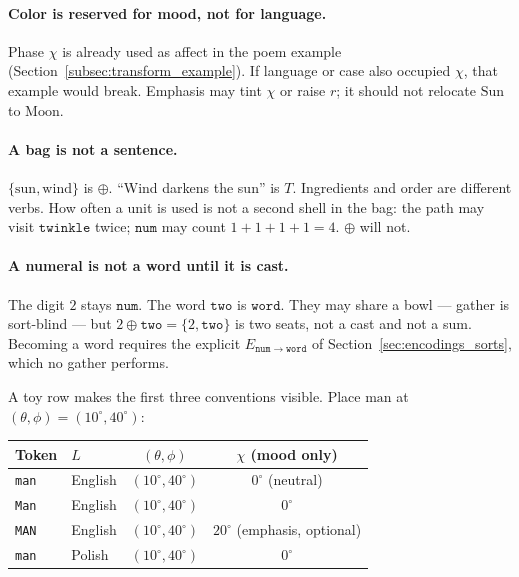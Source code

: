 \documentclass[12pt, a4paper]{article}
\begin{document}
\paragraph{Color is reserved for mood, not for language.}
Phase $\chi$ is already used as affect in the poem example
(Section~\ref{subsec:transform_example}). If language or case also
occupied $\chi$, that example would break. Emphasis may tint $\chi$
or raise $r$; it should not relocate $\mathrm{Sun}$ to $\mathrm{Moon}$.

\paragraph{A bag is not a sentence.}
$\{\mathrm{sun},\mathrm{wind}\}$ is $\oplus$.
``Wind darkens the sun'' is $T$. Ingredients and order are different
verbs. How often a unit is used is not a second shell in the bag:
the path may visit $\texttt{twinkle}$ twice; $\mathtt{num}$ may
count $1+1+1+1=4$. $\oplus$ will not.

\paragraph{A numeral is not a word until it is cast.}
The digit $2$ stays $\mathtt{num}$. The word $\texttt{two}$ is
$\mathtt{word}$. They may share a bowl --- gather is sort-blind ---
but $2\oplus\texttt{two}=\{2,\texttt{two}\}$ is two seats, not a cast
and not a sum. Becoming a word requires the explicit
$E_{\mathtt{num}\to\mathtt{word}}$ of
Section~\ref{sec:encodings_sorts}, which no gather performs.

A toy row makes the first three conventions visible. Place
$\mathrm{man}$ at $(\theta,\phi)=(10^\circ,40^\circ)$:

\begin{center}
\begin{tabular}{llcc}
Token & $L$ & $(\theta,\phi)$ & $\chi$ (mood only) \\
\hline
\texttt{man} & English & $(10^\circ,40^\circ)$ & $0^\circ$ (neutral) \\
\texttt{Man} & English & $(10^\circ,40^\circ)$ & $0^\circ$ \\
\texttt{MAN} & English & $(10^\circ,40^\circ)$ & $20^\circ$ (emphasis, optional) \\
\texttt{man} & Polish  & $(10^\circ,40^\circ)$ & $0^\circ$ \\
\end{tabular}
\end{center}
\end{document}

